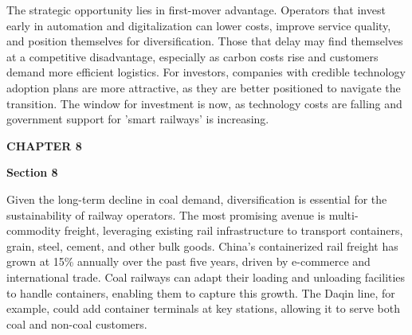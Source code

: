 \documentclass[10pt,a4paper]{article}
\begin{document}
\vspace{4pt}{\textcolor{BOBlue}{\scriptsize\bfseries DIAGNOSTIC ARCHITECTURE MAP}}\par
\begin{center}\end{center}

{\small {\small The strategic opportunity lies in first-mover advantage. Operators that invest early in automation and digitalization can lower costs, improve service quality, and position themselves for diversification. Those that delay may find themselves at a competitive disadvantage, especially as carbon costs rise and customers demand more efficient logistics. For investors, companies with credible technology adoption plans are more attractive, as they are better positioned to navigate the transition. The window for investment is now, as technology costs are falling and government support for 'smart railways' is increasing.}}

\clearpage
{\textcolor{BOBlue}{\scriptsize\bfseries CHAPTER 8}}\par\vspace{-1pt}
{\Large\sffamily\bfseries\color{BONavy} Section 8}\par\vspace{4pt}
{\small Given the long-term decline in coal demand, diversification is essential for the sustainability of railway operators. The most promising avenue is multi-commodity freight, leveraging existing rail infrastructure to transport containers, grain, steel, cement, and other bulk goods. China's containerized rail freight has grown at 15\% annually over the past five years, driven by e-commerce and international trade. Coal railways can adapt their loading and unloading facilities to handle containers, enabling them to capture this growth. The Daqin line, for example, could add container terminals at key stations, allowing it to serve both coal and non-coal customers.}
\end{document}
